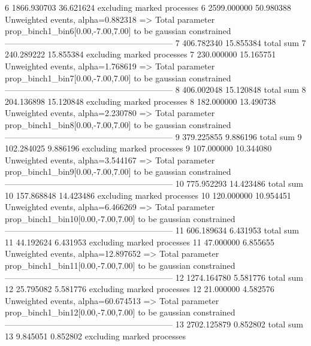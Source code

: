 6          1866.930703     36.621624       excluding marked processes    
6          2599.000000     50.980388       Unweighted events, alpha=0.882318
  => Total parameter prop_binch1_bin6[0.00,-7.00,7.00] to be gaussian constrained
------------------------------------------------------------
7          406.782340      15.855384       total sum                     
7          240.289222      15.855384       excluding marked processes    
7          230.000000      15.165751       Unweighted events, alpha=1.768619
  => Total parameter prop_binch1_bin7[0.00,-7.00,7.00] to be gaussian constrained
------------------------------------------------------------
8          406.002048      15.120848       total sum                     
8          204.136898      15.120848       excluding marked processes    
8          182.000000      13.490738       Unweighted events, alpha=2.230780
  => Total parameter prop_binch1_bin8[0.00,-7.00,7.00] to be gaussian constrained
------------------------------------------------------------
9          379.225855      9.886196        total sum                     
9          102.284025      9.886196        excluding marked processes    
9          107.000000      10.344080       Unweighted events, alpha=3.544167
  => Total parameter prop_binch1_bin9[0.00,-7.00,7.00] to be gaussian constrained
------------------------------------------------------------
10         775.952293      14.423486       total sum                     
10         157.868848      14.423486       excluding marked processes    
10         120.000000      10.954451       Unweighted events, alpha=6.466269
  => Total parameter prop_binch1_bin10[0.00,-7.00,7.00] to be gaussian constrained
------------------------------------------------------------
11         606.189634      6.431953        total sum                     
11         44.192624       6.431953        excluding marked processes    
11         47.000000       6.855655        Unweighted events, alpha=12.897652
  => Total parameter prop_binch1_bin11[0.00,-7.00,7.00] to be gaussian constrained
------------------------------------------------------------
12         1274.164780     5.581776        total sum                     
12         25.795082       5.581776        excluding marked processes    
12         21.000000       4.582576        Unweighted events, alpha=60.674513
  => Total parameter prop_binch1_bin12[0.00,-7.00,7.00] to be gaussian constrained
------------------------------------------------------------
13         2702.125879     0.852802        total sum                     
13         9.845051        0.852802        excluding marked processes    
